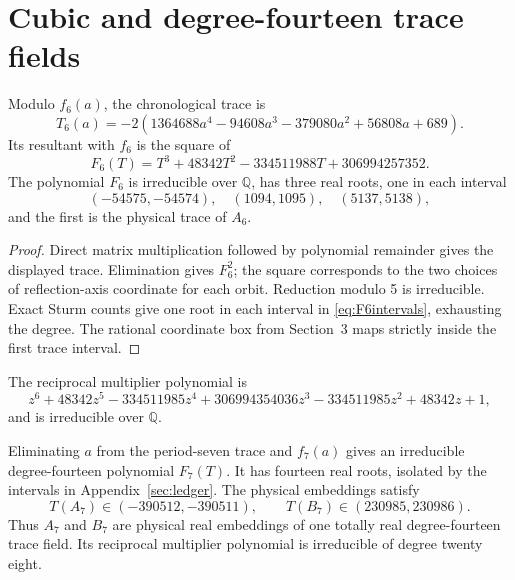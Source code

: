 \section{Cubic and degree-fourteen trace fields}

\begin{proposition}\label{prop:A6}
Modulo \(f_6(a)\), the chronological trace is
\[
 T_6(a)=-2(1364688a^4-94608a^3-379080a^2+56808a+689).
\]
Its resultant with \(f_6\) is the square of
\begin{equation}\label{eq:F6}
 F_6(T)=T^3+48342T^2-334511988T+306994257352.
\end{equation}
The polynomial \(F_6\) is irreducible over \(\mathbb Q\), has three real
roots, one in each interval
\begin{equation}\label{eq:F6intervals}
 (-54575,-54574),\quad(1094,1095),\quad(5137,5138),
\end{equation}
and the first is the physical trace of \(A_6\).
\end{proposition}

\begin{proof}
Direct matrix multiplication followed by polynomial remainder gives the
displayed trace.  Elimination gives \(F_6^2\); the square corresponds to the
two choices of reflection-axis coordinate for each orbit.  Reduction modulo
5 is irreducible.  Exact Sturm counts give one root in each interval in
\eqref{eq:F6intervals}, exhausting the degree.  The rational coordinate box
from Section~3 maps strictly inside the first trace interval.
\end{proof}

The reciprocal multiplier polynomial is
\begin{equation}\label{eq:A6multiplier}
 z^6+48342z^5-334511985z^4+306994354036z^3
 -334511985z^2+48342z+1,
\end{equation}
and is irreducible over \(\mathbb Q\).

\begin{proposition}\label{prop:P7}
Eliminating \(a\) from the period-seven trace and \(f_7(a)\) gives an
irreducible degree-fourteen polynomial \(F_7(T)\).  It has fourteen real
roots, isolated by the intervals in Appendix~\ref{sec:ledger}.  The physical
embeddings satisfy
\[
 T(A_7)\in(-390512,-390511),\qquad
 T(B_7)\in(230985,230986).
\]
Thus \(A_7\) and \(B_7\) are physical real embeddings of one totally real
degree-fourteen trace field.  Its reciprocal multiplier polynomial is
irreducible of degree twenty eight.
\end{proposition}

